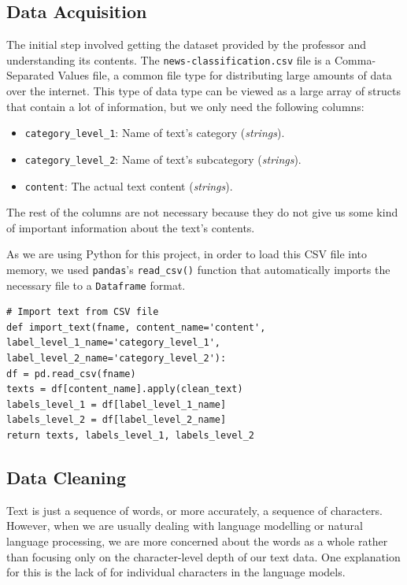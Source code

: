 \subsection{Data Acquisition}
The initial step involved getting the dataset provided by the professor and understanding its contents. The \verb|news-classification.csv| file is a Comma-Separated Values file, a common file type for distributing large amounts of data over the internet. 
This type of data type can be viewed as a large array of structs that contain a lot of information, but we only need the following columns:
\begin{itemize}
	\item \verb|category_level_1|: Name of text's category (\textit{strings}).
	\item \verb|category_level_2|: Name of text's subcategory (\textit{strings}).
	\item \verb|content|: The actual text content (\textit{strings}).
\end{itemize}
The rest of the columns are not necessary because they do not give us some kind of important information about the text's contents.

As we are using Python for this project, in order to load this CSV file into memory, we used \verb|pandas|'s \verb|read_csv()| function that automatically imports the necessary file to a \verb|Dataframe| format.\\

\begin{lstlisting}
# Import text from CSV file
def import_text(fname, content_name='content', label_level_1_name='category_level_1', label_level_2_name='category_level_2'):
df = pd.read_csv(fname)
texts = df[content_name].apply(clean_text)
labels_level_1 = df[label_level_1_name]
labels_level_2 = df[label_level_2_name]
return texts, labels_level_1, labels_level_2
\end{lstlisting}

\subsection{Data Cleaning}

Text is just a sequence of words, or more accurately, a sequence of characters. However, when we are usually dealing with language modelling or natural language processing, we are more concerned about the words as a whole rather than focusing only on the character-level depth of our text data. One explanation for this is the lack of  for individual characters in the language models.\\

